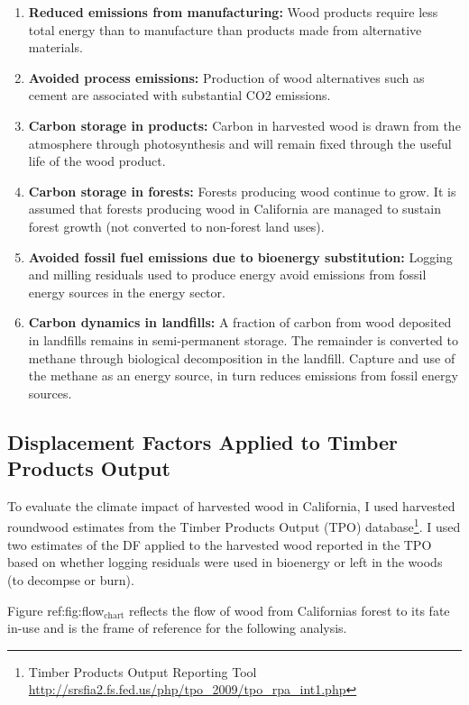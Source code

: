 \documentclass[a4paper]{article}
\begin{document}
\begin{enumerate}
\item \textbf{Reduced emissions from manufacturing:} Wood products require less total
energy than to manufacture than products made from alternative materials.
\item \textbf{Avoided process emissions:} Production of wood alternatives such as cement are associated with 
substantial CO2 emissions.
\item \textbf{Carbon storage in products:} Carbon in harvested wood is drawn from
the atmosphere through photosynthesis and will remain fixed through
the useful life of the wood product.
\item \textbf{Carbon storage in forests:} Forests producing wood continue to grow.
It is assumed that forests producing wood in California are managed
to sustain forest growth (not converted to non-forest land uses).
\item \textbf{Avoided fossil fuel emissions due to bioenergy substitution:}
Logging and milling residuals used to produce energy avoid emissions
from fossil energy sources in the energy sector.
\item \textbf{Carbon dynamics in landfills:} A fraction of carbon from wood
deposited in landfills remains in semi-permanent storage.
The remainder is converted to methane through biological
decomposition in the landfill. Capture and use of the methane as an
energy source, in turn reduces emissions from fossil energy sources.
\end{enumerate}

\subsection{Displacement Factors Applied to Timber Products Output}
\label{sec-3-3}

To evaluate the climate impact of harvested wood in California, I used
harvested roundwood estimates from the Timber Products Output (TPO)
database\footnote{Timber Products Output Reporting Tool \href{http://srsfia2.fs.fed.us/php/tpo_2009/tpo_rpa_int1.php}{\url{http://srsfia2.fs.fed.us/php/tpo_2009/tpo_rpa_int1.php}}}. I used two estimates of the DF applied
to the harvested wood reported in the TPO based on whether logging
residuals were used in bioenergy or left in the woods (to decompse or
burn).

Figure ref:fig:flow$_{\text{chart}}$ reflects the flow of wood
from Californias forest to its fate in-use and is the frame of
reference for the following analysis.
\end{document}
